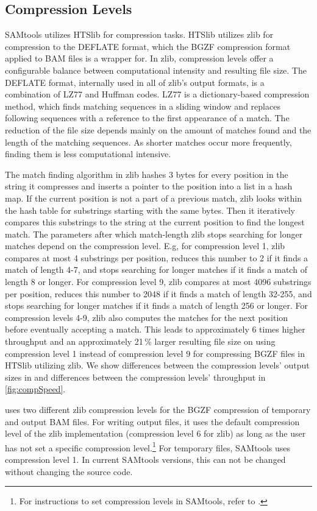 \subsection{Compression Levels}
SAMtools utilizes HTSlib for compression tasks. HTSlib utilizes zlib for compression to the DEFLATE format, which the BGZF compression format applied to BAM files is a wrapper for.
In zlib, compression levels offer a configurable balance between computational intensity and resulting file size. The DEFLATE format, internally used in all of zlib's output formats, is a combination of LZ77 and Huffman codes. LZ77 is a dictionary-based compression method, which finds matching sequences in a sliding window and replaces following sequences with a reference to the first appearance of a match. The reduction of the file size depends mainly on the amount of matches found and the length of the matching sequences. As shorter matches occur more frequently, finding them is less computational intensive.

The match finding algorithm in zlib hashes 3 bytes for every position in the string it compresses and inserts a pointer to the position into a list in a hash map. If the current position is not a part of a previous match, zlib looks within the hash table for substrings starting with the same bytes. Then it iteratively compares this substrings to the string at the current position to find the longest match. The parameters after which match-length zlib stops searching for longer matches depend on the compression level. E.g, for compression level 1, zlib compares at most 4 substrings per position, reduces this number to 2 if it finds a match of length 4-7, and stops searching for longer matches if it finds a match of length 8 or longer. For compression level 9, zlib compares at most 4096 substrings per position, reduces this number to 2048 if it finds a match of length 32-255, and stops searching for longer matches if it finds a match of length 256 or longer. For compression levels 4-9, zlib also computes the matches for the next position before eventually accepting a match. This leads to approximately 6 times higher throughput and an approximately 21\,\% larger resulting file size on using compression level 1 instead of compression level 9 for compressing BGZF files in HTSlib utilizing zlib. We show differences between the compression levels' output sizes in  and differences between the compression levels' throughput in \ref{fig:compSpeed}.

\sort uses two different zlib compression levels for the BGZF compression of temporary and output BAM files. For writing output files, it uses the default compression level of the zlib implementation (compression level 6 for zlib) as long as the user has not set a specific compression level.\footnote{For instructions to set compression levels in SAMtools, refer to .} For temporary files, SAMtools uses compression level 1. In current SAMtools versions, this can not be changed without changing the source code.


